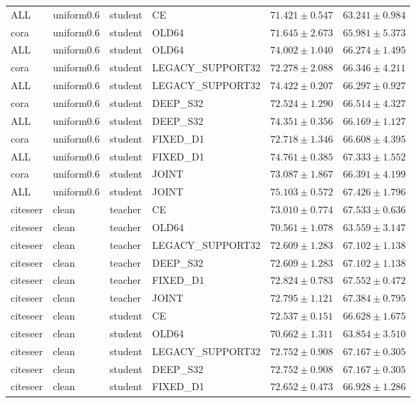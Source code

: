 \begin{longtable}{llllrr}
ALL & uniform0.6 & student & CE & $71.421 \pm 0.547$ & $63.241 \pm 0.984$ \\
cora & uniform0.6 & student & OLD64 & $71.645 \pm 2.673$ & $65.981 \pm 5.373$ \\
ALL & uniform0.6 & student & OLD64 & $74.002 \pm 1.040$ & $66.274 \pm 1.495$ \\
cora & uniform0.6 & student & LEGACY\_SUPPORT32 & $72.278 \pm 2.088$ & $66.346 \pm 4.211$ \\
ALL & uniform0.6 & student & LEGACY\_SUPPORT32 & $74.422 \pm 0.207$ & $66.297 \pm 0.927$ \\
cora & uniform0.6 & student & DEEP\_S32 & $72.524 \pm 1.290$ & $66.514 \pm 4.327$ \\
ALL & uniform0.6 & student & DEEP\_S32 & $74.351 \pm 0.356$ & $66.169 \pm 1.127$ \\
cora & uniform0.6 & student & FIXED\_D1 & $72.718 \pm 1.346$ & $66.608 \pm 4.395$ \\
ALL & uniform0.6 & student & FIXED\_D1 & $74.761 \pm 0.385$ & $67.333 \pm 1.552$ \\
cora & uniform0.6 & student & JOINT & $73.087 \pm 1.867$ & $66.391 \pm 4.199$ \\
ALL & uniform0.6 & student & JOINT & $75.103 \pm 0.572$ & $67.426 \pm 1.796$ \\
citeseer & clean & teacher & CE & $73.010 \pm 0.774$ & $67.533 \pm 0.636$ \\
citeseer & clean & teacher & OLD64 & $70.561 \pm 1.078$ & $63.559 \pm 3.147$ \\
citeseer & clean & teacher & LEGACY\_SUPPORT32 & $72.609 \pm 1.283$ & $67.102 \pm 1.138$ \\
citeseer & clean & teacher & DEEP\_S32 & $72.609 \pm 1.283$ & $67.102 \pm 1.138$ \\
citeseer & clean & teacher & FIXED\_D1 & $72.824 \pm 0.783$ & $67.552 \pm 0.472$ \\
citeseer & clean & teacher & JOINT & $72.795 \pm 1.121$ & $67.384 \pm 0.795$ \\
citeseer & clean & student & CE & $72.537 \pm 0.151$ & $66.628 \pm 1.675$ \\
citeseer & clean & student & OLD64 & $70.662 \pm 1.311$ & $63.854 \pm 3.510$ \\
citeseer & clean & student & LEGACY\_SUPPORT32 & $72.752 \pm 0.908$ & $67.167 \pm 0.305$ \\
citeseer & clean & student & DEEP\_S32 & $72.752 \pm 0.908$ & $67.167 \pm 0.305$ \\
citeseer & clean & student & FIXED\_D1 & $72.652 \pm 0.473$ & $66.928 \pm 1.286$ \\

\end{longtable}
